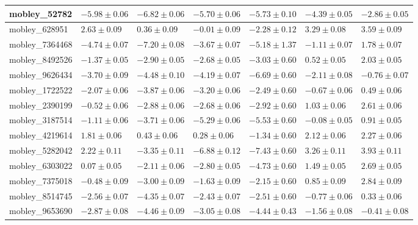 \documentclass{article}
\begin{document}
\begin{landscape}
\begin{longtable}{|l{3.0cm}|l{3.0cm}|l{3.2cm}|l{3.6cm}|l{3.0cm}|l{3.0cm}|l{3.0cm}|}
mobley\_52782	&	$	-5.98	\pm	0.06	$	&	$	-6.82	\pm	0.06	$	&	$	-5.70	\pm	0.06	$	&	$	-5.73	\pm	0.10	$	&	$	-4.39	\pm	0.05	$	&	$	-2.86	\pm	0.05	$	\\ \hline
mobley\_628951	&	$	2.63	\pm	0.09	$	&	$	0.36	\pm	0.09	$	&	$	-0.01	\pm	0.09	$	&	$	-2.28	\pm	0.12	$	&	$	3.29	\pm	0.08	$	&	$	3.59	\pm	0.09	$	\\ \hline
mobley\_7364468	&	$	-4.74	\pm	0.07	$	&	$	-7.20	\pm	0.08	$	&	$	-3.67	\pm	0.07	$	&	$	-5.18	\pm	1.37	$	&	$	-1.11	\pm	0.07	$	&	$	1.78	\pm	0.07	$	\\ \hline
mobley\_8492526	&	$	-1.37	\pm	0.05	$	&	$	-2.90	\pm	0.05	$	&	$	-2.68	\pm	0.05	$	&	$	-3.03	\pm	0.60	$	&	$	0.52	\pm	0.05	$	&	$	2.03	\pm	0.05	$	\\ \hline
mobley\_9626434	&	$	-3.70	\pm	0.09	$	&	$	-4.48	\pm	0.10	$	&	$	-4.19	\pm	0.07	$	&	$	-6.69	\pm	0.60	$	&	$	-2.11	\pm	0.08	$	&	$	-0.76	\pm	0.07	$	\\ \hline
mobley\_1722522	&	$	-2.07	\pm	0.06	$	&	$	-3.87	\pm	0.06	$	&	$	-3.20	\pm	0.06	$	&	$	-2.49	\pm	0.60	$	&	$	-0.67	\pm	0.06	$	&	$	0.49	\pm	0.06	$	\\ \hline
mobley\_2390199	&	$	-0.52	\pm	0.06	$	&	$	-2.88	\pm	0.06	$	&	$	-2.68	\pm	0.06	$	&	$	-2.92	\pm	0.60	$	&	$	1.03	\pm	0.06	$	&	$	2.61	\pm	0.06	$	\\ \hline
mobley\_3187514	&	$	-1.11	\pm	0.06	$	&	$	-3.71	\pm	0.06	$	&	$	-5.29	\pm	0.06	$	&	$	-5.53	\pm	0.60	$	&	$	-0.08	\pm	0.05	$	&	$	0.91	\pm	0.05	$	\\ \hline
mobley\_4219614	&	$	1.81	\pm	0.06	$	&	$	0.43	\pm	0.06	$	&	$	0.28	\pm	0.06	$	&	$	-1.34	\pm	0.60	$	&	$	2.12	\pm	0.06	$	&	$	2.27	\pm	0.06	$	\\ \hline
mobley\_5282042	&	$	2.22	\pm	0.11	$	&	$	-3.35	\pm	0.11	$	&	$	-6.88	\pm	0.12	$	&	$	-7.43	\pm	0.60	$	&	$	3.26	\pm	0.11	$	&	$	3.93	\pm	0.11	$	\\ \hline
mobley\_6303022	&	$	0.07	\pm	0.05	$	&	$	-2.11	\pm	0.06	$	&	$	-2.80	\pm	0.05	$	&	$	-4.73	\pm	0.60	$	&	$	1.49	\pm	0.05	$	&	$	2.69	\pm	0.05	$	\\ \hline
mobley\_7375018	&	$	-0.48	\pm	0.09	$	&	$	-3.00	\pm	0.09	$	&	$	-1.63	\pm	0.09	$	&	$	-2.15	\pm	0.60	$	&	$	0.85	\pm	0.09	$	&	$	2.84	\pm	0.09	$	\\ \hline
mobley\_8514745	&	$	-2.56	\pm	0.07	$	&	$	-4.35	\pm	0.07	$	&	$	-2.43	\pm	0.07	$	&	$	-2.51	\pm	0.60	$	&	$	-0.77	\pm	0.06	$	&	$	0.33	\pm	0.06	$	\\ \hline
mobley\_9653690	&	$	-2.87	\pm	0.08	$	&	$	-4.46	\pm	0.09	$	&	$	-3.05	\pm	0.08	$	&	$	-4.44	\pm	0.43	$	&	$	-1.56	\pm	0.08	$	&	$	-0.41	\pm	0.08	$	\\ \hline

\end{longtable}
\end{landscape}
\end{document}
